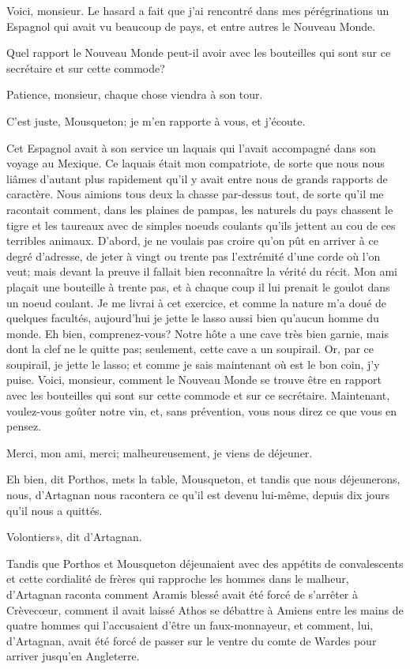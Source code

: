 \speak  Voici, monsieur. Le hasard a fait que j'ai rencontré dans mes pérégrinations un Espagnol qui avait vu beaucoup de pays, et entre autres le Nouveau Monde. 

\speak  Quel rapport le Nouveau Monde peut-il avoir avec les bouteilles qui sont sur ce secrétaire et sur cette commode? 

\speak  Patience, monsieur, chaque chose viendra à son tour. 

\speak  C'est juste, Mousqueton; je m'en rapporte à vous, et j'écoute. 

\speak  Cet Espagnol avait à son service un laquais qui l'avait accompagné dans son voyage au Mexique. Ce laquais était mon compatriote, de sorte que nous nous liâmes d'autant plus rapidement qu'il y avait entre nous de grands rapports de caractère. Nous aimions tous deux la chasse par-dessus tout, de sorte qu'il me racontait comment, dans les plaines de pampas, les naturels du pays chassent le tigre et les taureaux avec de simples noeuds coulants qu'ils jettent au cou de ces terribles animaux. D'abord, je ne voulais pas croire qu'on pût en arriver à ce degré d'adresse, de jeter à vingt ou trente pas l'extrémité d'une corde où l'on veut; mais devant la preuve il fallait bien reconnaître la vérité du récit. Mon ami plaçait une bouteille à trente pas, et à chaque coup il lui prenait le goulot dans un noeud coulant. Je me livrai à cet exercice, et comme la nature m'a doué de quelques facultés, aujourd'hui je jette le lasso aussi bien qu'aucun homme du monde. Eh bien, comprenez-vous? Notre hôte a une cave très bien garnie, mais dont la clef ne le quitte pas; seulement, cette cave a un soupirail. Or, par ce soupirail, je jette le lasso; et comme je sais maintenant où est le bon coin, j'y puise. Voici, monsieur, comment le Nouveau Monde se trouve être en rapport avec les bouteilles qui sont sur cette commode et sur ce secrétaire. Maintenant, voulez-vous goûter notre vin, et, sans prévention, vous nous direz ce que vous en pensez. 

\speak  Merci, mon ami, merci; malheureusement, je viens de déjeuner. 

\speak  Eh bien, dit Porthos, mets la table, Mousqueton, et tandis que nous déjeunerons, nous, d'Artagnan nous racontera ce qu'il est devenu lui-même, depuis dix jours qu'il nous a quittés. 

\speak  Volontiers», dit d'Artagnan. 

Tandis que Porthos et Mousqueton déjeunaient avec des appétits de convalescents et cette cordialité de frères qui rapproche les hommes dans le malheur, d'Artagnan raconta comment Aramis blessé avait été forcé de s'arrêter à Crèvecœur, comment il avait laissé Athos se débattre à Amiens entre les mains de quatre hommes qui l'accusaient d'être un faux-monnayeur, et comment, lui, d'Artagnan, avait été forcé de passer sur le ventre du comte de Wardes pour arriver jusqu'en Angleterre. 

